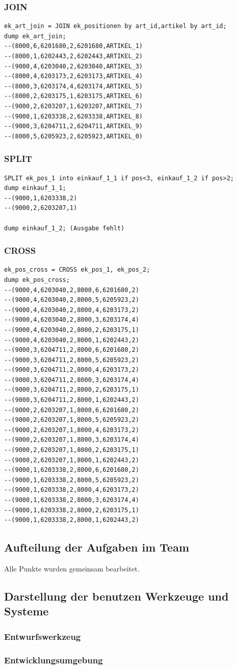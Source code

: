 \begin{itemize}
\subsubsection*{JOIN}
\begin{lstlisting}
ek_art_join = JOIN ek_positionen by art_id,artikel by art_id;
dump ek_art_join;
--(8000,6,6201680,2,6201680,ARTIKEL_1)
--(8000,1,6202443,2,6202443,ARTIKEL_2)
--(9000,4,6203040,2,6203040,ARTIKEL_3)
--(8000,4,6203173,2,6203173,ARTIKEL_4)
--(8000,3,6203174,4,6203174,ARTIKEL_5)
--(8000,2,6203175,1,6203175,ARTIKEL_6)
--(9000,2,6203207,1,6203207,ARTIKEL_7)
--(9000,1,6203338,2,6203338,ARTIKEL_8)
--(9000,3,6204711,2,6204711,ARTIKEL_9)
--(8000,5,6205923,2,6205923,ARTIKEL_0)
\end{lstlisting}

\subsubsection*{SPLIT}
\begin{lstlisting}
SPLIT ek_pos_1 into einkauf_1_1 if pos<3, einkauf_1_2 if pos>2;
dump einkauf_1_1;
--(9000,1,6203338,2)
--(9000,2,6203207,1)

dump einkauf_1_2; (Ausgabe fehlt)
\end{lstlisting}

\subsubsection*{CROSS}
\begin{lstlisting}
ek_pos_cross = CROSS ek_pos_1, ek_pos_2;
dump ek_pos_cross;
--(9000,4,6203040,2,8000,6,6201680,2)
--(9000,4,6203040,2,8000,5,6205923,2)
--(9000,4,6203040,2,8000,4,6203173,2)
--(9000,4,6203040,2,8000,3,6203174,4)
--(9000,4,6203040,2,8000,2,6203175,1)
--(9000,4,6203040,2,8000,1,6202443,2)
--(9000,3,6204711,2,8000,6,6201680,2)
--(9000,3,6204711,2,8000,5,6205923,2)
--(9000,3,6204711,2,8000,4,6203173,2)
--(9000,3,6204711,2,8000,3,6203174,4)
--(9000,3,6204711,2,8000,2,6203175,1)
--(9000,3,6204711,2,8000,1,6202443,2)
--(9000,2,6203207,1,8000,6,6201680,2)
--(9000,2,6203207,1,8000,5,6205923,2)
--(9000,2,6203207,1,8000,4,6203173,2)
--(9000,2,6203207,1,8000,3,6203174,4)
--(9000,2,6203207,1,8000,2,6203175,1)
--(9000,2,6203207,1,8000,1,6202443,2)
--(9000,1,6203338,2,8000,6,6201680,2)
--(9000,1,6203338,2,8000,5,6205923,2)
--(9000,1,6203338,2,8000,4,6203173,2)
--(9000,1,6203338,2,8000,3,6203174,4)
--(9000,1,6203338,2,8000,2,6203175,1)
--(9000,1,6203338,2,8000,1,6202443,2)
\end{lstlisting}
\end{itemize}
\subsection*{Aufteilung der Aufgaben im Team}
Alle Punkte wurden gemeinsam bearbeitet.
\subsection*{Darstellung der benutzen Werkzeuge und Systeme}
\subsubsection*{Entwurfswerkzeug}
\subsubsection*{Entwicklungsumgebung}


